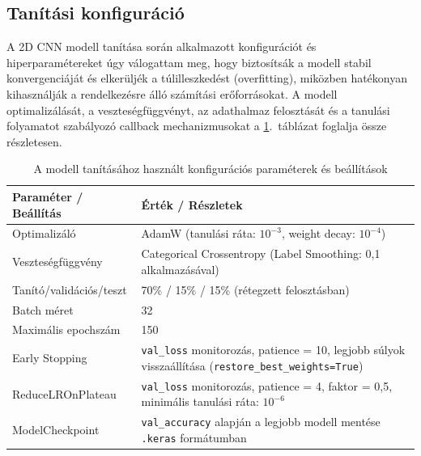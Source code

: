 \subsection{Tanítási konfiguráció}


A 2D CNN modell tanítása során alkalmazott konfigurációt és hiperparamétereket úgy válogattam meg, hogy biztosítsák a modell stabil konvergenciáját és elkerüljék a túlilleszkedést (overfitting), miközben hatékonyan kihasználják a rendelkezésre álló számítási erőforrásokat. A modell optimalizálását, a veszteségfüggvényt, az adathalmaz felosztását és a tanulási folyamatot szabályozó callback mechanizmusokat a \ref{tab:training_config}.~táblázat foglalja össze részletesen.

\begin{table}[H]
\centering
\caption{A modell tanításához használt konfigurációs paraméterek és beállítások}
\label{tab:training_config}
\begin{tabular}{lp{8.0cm}}
\toprule
\textbf{Paraméter / Beállítás} & \textbf{Érték / Részletek} \\
\midrule
Optimalizáló & AdamW (tanulási ráta: $10^{-3}$, weight decay: $10^{-4}$) \\
Veszteségfüggvény & Categorical Crossentropy (Label Smoothing: 0,1 alkalmazásával) \\
Tanító/validációs/teszt & 70\% / 15\% / 15\% (rétegzett felosztásban) \\
Batch méret & 32 \\
Maximális epochszám & 150 \\
Early Stopping & \texttt{val\_loss} monitorozás, patience = 10, legjobb súlyok visszaállítása (\texttt{restore\_best\_weights=True}) \\
ReduceLROnPlateau & \texttt{val\_loss} monitorozás, patience = 4, faktor = 0{,}5, minimális tanulási ráta: $10^{-6}$ \\
ModelCheckpoint & \texttt{val\_accuracy} alapján a legjobb modell mentése \texttt{.keras} formátumban \\
\bottomrule
\end{tabular}
\end{table}

